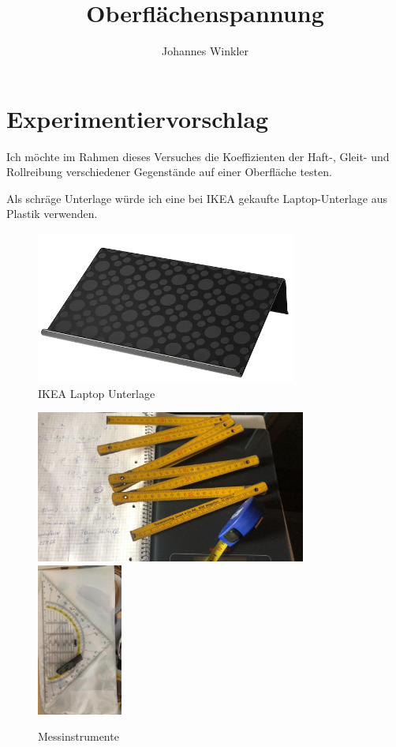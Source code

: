 \documentclass{article}
\title{Oberflächenspannung}
\author{Johannes Winkler}
\date{}
\begin{document}
 
 
 
\pagestyle{fancy}


\tableofcontents

\newpage


\setcounter{section}{-1}

\section{Experimentiervorschlag}


Ich möchte im Rahmen dieses Versuches die Koeffizienten der Haft-, Gleit- und Rollreibung verschiedener Gegenstände auf einer Oberfläche testen. 

Als schräge Unterlage würde ich eine bei IKEA gekaufte Laptop-Unterlage aus Plastik verwenden. 

\begin{figure}[H]
\includegraphics[height=5cm]{unterlage.png}
\caption{IKEA Laptop Unterlage}
\end{figure}

\begin{figure}[H]
\includegraphics[height=5cm]{zeux.jpg}
\includegraphics[height=5cm]{lineal.jpg}
\caption{Messinstrumente}
\end{figure}
\end{document}
